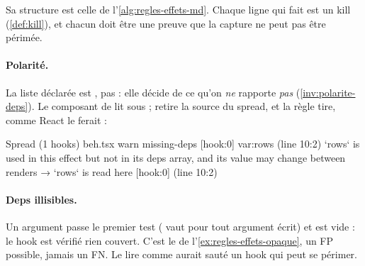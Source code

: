 Sa structure est celle de l'\cref{alg:regles-effets-md}. Chaque ligne qui fait  est un kill (\cref{def:kill}), et chacun doit être une preuve que la capture ne peut pas être périmée.

\begin{algorithm}[htbp]
\caption{ (lecture de )}
\label{alg:regles-effets-md}
\end{algorithm}

\paragraph{Polarité.} La liste déclarée est , pas  : elle décide de ce qu'on \emph{ne} rapporte \emph{pas} (\cref{inv:polarite-deps}). Le composant  de  lit  sous \code{[...rows]} ;  retire la source du spread, et la règle tire, comme React le ferait :
\begin{sortie}
  Spread  (1 hooks)  beh.tsx
    warn   missing-deps  [hook:0]  var:rows  (line 10:2)  `rows` is used in this effect but not in its deps array, and its value may change between renders
       → `rows` is read here [hook:0] (line 10:2)
\end{sortie}

\paragraph{Deps illisibles.} Un argument  passe le premier test ( vaut  pour tout argument écrit) et  est vide : le hook est vérifié \og rien couvert\fg{}. C'est le  de l'\cref{ex:regles-effets-opaque}, un FP possible, jamais un FN. Le lire comme  aurait sauté un hook qui peut se périmer.


